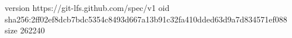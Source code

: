 version https://git-lfs.github.com/spec/v1
oid sha256:2ff02ef8dcb7bdc5354c8493d667a13b91c32fa410dded63d9a7d834571ef088
size 262240
